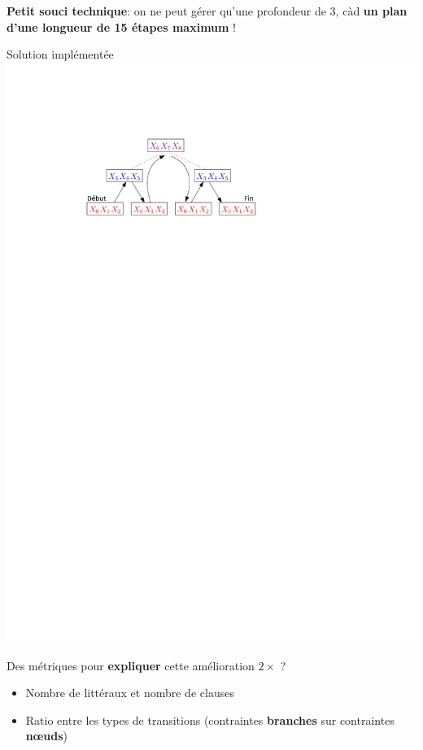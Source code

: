 \documentclass[english,french,usenames,dvipsnames]{beamer}
\begin{document}
\begin{frame}
\textbf{Petit souci technique}: on ne peut gérer qu'une profondeur de 3, càd \textbf{un plan d'une longueur de 15 étapes maximum} !
\begin{exampleblock}{Solution implémentée}
\includegraphics[width=\textwidth]{figures/coplas2018/planif-tree-5.pdf}
\end{exampleblock}
\end{frame}

\begin{frame}
Des métriques pour \textbf{expliquer} cette amélioration \textbf{$2\times$} ?
\begin{itemize}
\item Nombre de littéraux et nombre de clauses
\item Ratio entre les types de transitions (contraintes \textbf{branches} sur contraintes \textbf{nœuds})
\end{itemize}
\end{frame}
\end{document}
